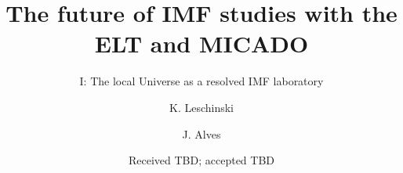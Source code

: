 \documentclass{aa}
\begin{document}
 

  \title{The future of IMF studies with the ELT and MICADO}
  \subtitle{I: The local Universe as a resolved IMF laboratory}
  \author{K. Leschinski
     \and
          J. Alves
     }


  \date{Received TBD; accepted TBD}

      

  \keywords{}

\maketitle





%








\end{document}
